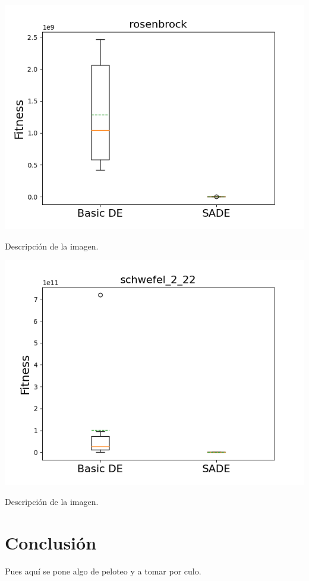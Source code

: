 \documentclass[11pt, a4paper, titlepage]{article}
\begin{document}
\begin{center}
\includegraphics[scale=0.85]{rosenbrock}
\end{center}
Descripción de la imagen.
\begin{center}
\includegraphics[scale=0.85]{schwefel_2_22}
\end{center}
Descripción de la imagen.
\section{Conclusión}
Pues aquí se pone algo de peloteo y a tomar por culo.
\end{document}
